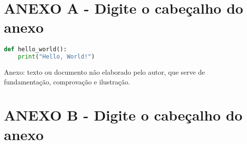 \documentclass[
	12pt,				%
	openright,			%
	oneside,			%
	a4paper,			%
	brazil				%
	]{abntex2}
\begin{document}
\begin{anexosenv}

\partanexos
\renewcommand{\ABNTEXchapterfontsize}{\ABNTEXsectionfont}

\chapter*{\normalsize ANEXO A - Digite o cabeçalho do anexo}
\begin{lstlisting}[language = Python, caption={Código}, label={lst:hello_world}]
def hello_world():
    print("Hello, World!")
\end{lstlisting}
Anexo: texto ou documento não elaborado pelo autor, que serve de fundamentação, comprovação e ilustração.

\chapter*{\normalsize ANEXO B - Digite o cabeçalho do anexo}

\end{anexosenv}
\end{document}
